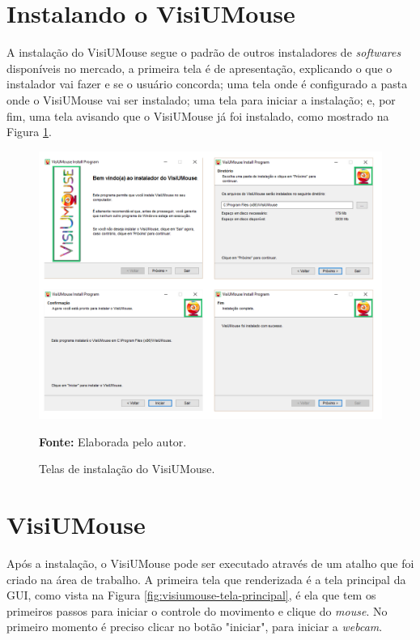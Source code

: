 \section{Instalando o VisiUMouse}
A instalação do VisiUMouse segue o padrão de outros instaladores de \textit{softwares} disponíveis no mercado, a primeira tela é de apresentação, explicando o que o instalador vai fazer e se o usuário concorda; uma tela onde é configurado a pasta onde o VisiUMouse vai ser instalado; uma tela para iniciar a instalação; e, por fim, uma tela avisando que o VisiUMouse já foi instalado, como mostrado na Figura \ref{fig:visiumouse-instalador}.

\begin{figure}[htbp]
\caption{Telas de instalação do VisiUMouse.} 
\centering \includegraphics[scale=0.45]{img/software-instalador.png}

{\fontsize{11}{11}\selectfont \textbf{Fonte:} Elaborada pelo autor.}
\label{fig:visiumouse-instalador}
\end{figure}

\section{VisiUMouse}
Após a instalação, o VisiUMouse pode ser executado através de um atalho que foi criado na área de trabalho. A primeira tela que renderizada é a tela principal da GUI, como vista na Figura \ref{fig:visiumouse-tela-principal}, é ela que tem os primeiros passos para iniciar o controle do movimento e clique do \textit{mouse}. No primeiro momento é preciso clicar no botão "iniciar", para iniciar a \textit{webcam}.

